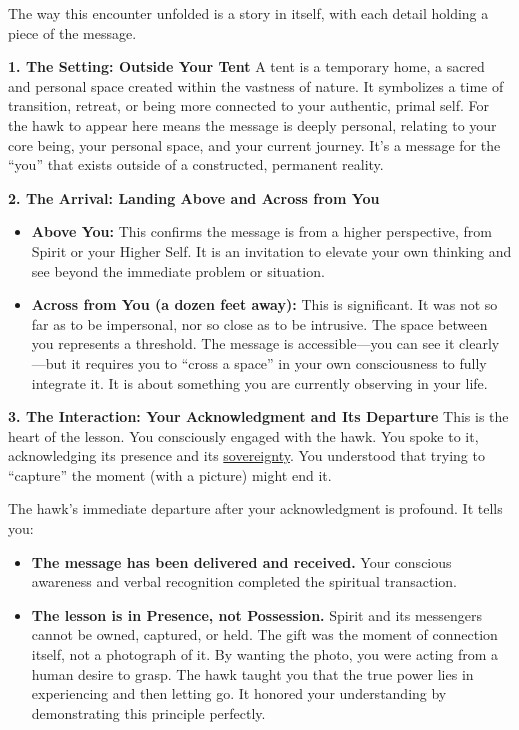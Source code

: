 \documentclass{article}
\begin{document}
The way this encounter unfolded is a story in itself, with each detail holding a piece of the message.

\textbf{1. The Setting: Outside Your Tent} A tent is a temporary home, a sacred and personal space created within the vastness of nature. It symbolizes a time of transition, retreat, or being more connected to your authentic, primal self. For the hawk to appear here means the message is deeply personal, relating to your core being, your personal space, and your current journey. It's a message for the ``you'' that exists outside of a constructed, permanent reality.

\textbf{2. The Arrival: Landing Above and Across from You}

\begin{itemize}
\item
  \textbf{Above You:} This confirms the message is from a higher perspective, from Spirit or your Higher Self. It is an invitation to elevate your own thinking and see beyond the immediate problem or situation.
\item
  \textbf{Across from You (a dozen feet away):} This is significant. It was not so far as to be impersonal, nor so close as to be intrusive. The space between you represents a threshold. The message is accessible---you can see it clearly---but it requires you to ``cross a space'' in your own consciousness to fully integrate it. It is about something you are currently observing in your life.
\end{itemize}

\textbf{3. The Interaction: Your Acknowledgment and Its Departure} This is the heart of the lesson. You consciously engaged with the hawk. You spoke to it, acknowledging its presence and its \hyperlink{gloss:sovereignty}{sovereignty}. You understood that trying to ``capture'' the moment (with a picture) might end it.

The hawk's immediate departure after your acknowledgment is profound. It tells you:

\begin{itemize}
\item
  \textbf{The message has been delivered and received.} Your conscious awareness and verbal recognition completed the spiritual transaction.
\item
  \textbf{The lesson is in Presence, not Possession.} Spirit and its messengers cannot be owned, captured, or held. The gift was the moment of connection itself, not a photograph of it. By wanting the photo, you were acting from a human desire to grasp. The hawk taught you that the true power lies in experiencing and then letting go. It honored your understanding by demonstrating this principle perfectly.
\end{itemize}
\end{document}
